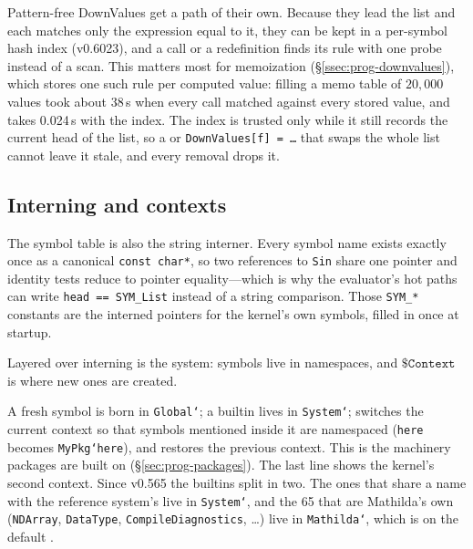 Pattern-free DownValues get a path of their own. Because they lead the list and each
matches only the expression equal to it, they can be kept in a per-symbol hash index
(v0.6023), and a call or a redefinition finds its rule with one probe instead of a
scan. This matters most for memoization
(\S\ref{ssec:prog-downvalues}), which stores one such rule per computed value: filling
a memo table of \(20{,}000\) values took about 38\,s when every call matched against
every stored value, and takes 0.024\,s with the index. The index is trusted only while
it still records the current head of the list, so a  or
\texttt{DownValues[f] = \ldots} that swaps the whole list cannot leave it stale, and
every removal drops it.

\subsection*{Interning and contexts}

The symbol table is also the string interner. Every symbol name exists exactly once as
a canonical \texttt{const char*}, so two references to \texttt{Sin} share one pointer
and identity tests reduce to pointer equality---which is why the evaluator's hot paths
can write \texttt{head == SYM\_List} instead of a string comparison. Those
\texttt{SYM\_*} constants are the interned pointers for the kernel's own symbols,
filled in once at startup.

Layered over interning is the  system: symbols live in namespaces, and
\(\mathtt{\$Context}\) is where new ones are created.


A fresh symbol is born in \texttt{Global`}; a builtin lives in \texttt{System`};
 switches the current context so that symbols mentioned inside it are
namespaced (\texttt{here} becomes \texttt{MyPkg`here}), and  restores the
previous context. This is the machinery packages are built on
(\S\ref{sec:prog-packages}). The last line shows the kernel's second context. Since
v0.565 the builtins split in two. The ones that share a name with the reference
system's live in \texttt{System`}, and the 65 that are Mathilda's own
(\texttt{NDArray}, \texttt{DataType}, \texttt{CompileDiagnostics}, \ldots) live in
\texttt{Mathilda`}, which is on the default .


